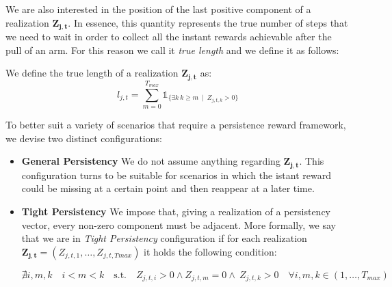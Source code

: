 We are also interested in the position of the last positive component of a realization $\boldsymbol{Z_{j,t}}$. In essence, this quantity represents the true number of steps that we need to wait in order to collect all the instant rewards achievable after the pull of an arm. For this reason we call it \emph{true length} and we define it as follows:
\begin{definition}
	We define the true length of a realization $\boldsymbol{Z_{j,t}}$ as:
		$$l_{j,t} = \sum_{m=0}^{T_{max}}\mathds{1}_{\{\exists k \ k\geq m \ \mid \ Z_{j,t,k} > 0\}}$$
\end{definition}




To better suit a variety of scenarios that require a persistence reward framework, we devise two distinct configurations:
\begin{itemize}
	\item \textbf{General Persistency} We do not assume anything regarding $\boldsymbol{Z_{j,t}}$. This configuration turns to be suitable for scenarios in which the istant reward could be missing at a certain point and then reappear at a later time. 
	
	\item \textbf{Tight Persistency} We impose that, giving a realization of a persistency vector, every non-zero component must be adjacent. More formally, we say that we are in \emph{Tight Persistency} configuration if for each realization $\boldsymbol{Z_{j,t}}= (Z_{j,t,1},\dots, Z_{j,t,Tmax})$ it holds the following condition:
	\begin{center}
		$\nexists i,m,k  \quad i<m<k\quad \text{s.t.}\quad Z_{j,t,i}>0 \wedge Z_{j,t,m}=0 \wedge \ Z_{j,t,k}>0 \quad \forall i,m,k 	\in (1,\dots,T_{max})$
	\end{center}
\end{itemize}







